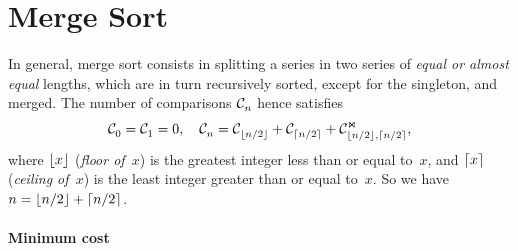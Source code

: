 \section{Merge Sort}

In general, merge sort consists in splitting a series in two series of
\emph{equal or almost equal} lengths, which are in turn recursively
sorted, except for the singleton, and merged. The number of
comparisons \(\mathcal{C}_{n}^{}\) hence satisfies
\begin{equation}
\mathcal{C}_{0}^{} = \mathcal{C}_{1}^{} = 0,\quad
\mathcal{C}_{n}^{} = \mathcal{C}_{\lfloor{n/2}\rfloor}^{}
+ \mathcal{C}_{\lceil{n/2}\rceil}^{}
+ \mathcal{C}_{\lfloor{n/2}\rfloor,\lceil{n/2}\rceil}^{\Join},
\label{eq:Ctop}
\end{equation}
where \(\lfloor{x}\rfloor\) (\textsl{floor of~\(x\)}) is the greatest integer
less than or equal to~\(x\), and \(\lceil{x}\rceil\) (\textsl{ceiling
  of~\(x\)}) is the least integer greater than or equal to~\(x\). So
we have \(n = \lfloor{n/2}\rfloor + \lceil{n/2}\rceil\).

\paragraph{Minimum cost}


